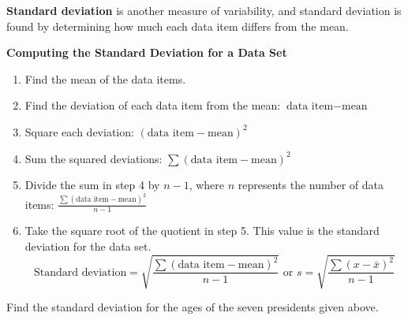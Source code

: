 \documentclass[12pt, letterpaper]{article}
\newcounter{exercise}
\theoremstyle{definition}
\begin{document}
\begin{defn}
\textbf{Standard deviation} is another measure of variability, and standard deviation is found by determining how much each data item differs from the mean.

\textbf{Computing the Standard Deviation for a Data Set}
\begin{enumerate}
\item Find the mean of the data items.
\item Find the deviation of each data item from the mean:  $\text{data item}-\text{mean}$
\item Square each deviation:  $(\text{data item} - \text{mean})^2$
\item Sum the squared deviations:  $\sum(\text{data item} - \text{mean})^2$
\item Divide the sum in step 4 by $n-1$, where $n$ represents the number of data items:  $\displaystyle\frac{\sum (\text{data item} - \text{mean})^2}{n-1}$
\item Take the square root of the quotient in step 5.  This value is the standard deviation for the data set.
$$ \text{Standard deviation}=\sqrt{\frac{\sum (\text{data item} - \text{mean})^2}{n-1}}\text{  or  } s=\sqrt{\frac{\sum(x-\bar{x})^2}{n-1}} $$
\end{enumerate}
\end{defn} 


\begin{exercise}  Find the standard deviation for the ages of the seven presidents given above.
\end{exercise}


\vfill


\newpage


\end{document}
